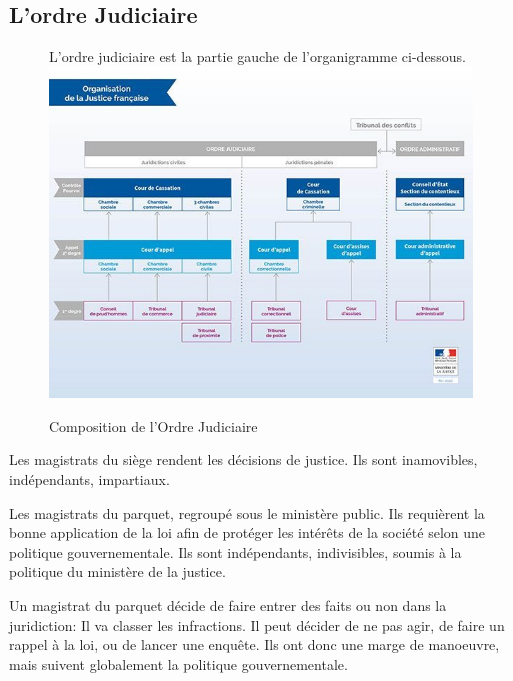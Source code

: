 \documentclass[math]{cours}
\begin{document}
\subsection{L'ordre Judiciaire}

\begin{figure}[h]
	\centering
	L'ordre judiciaire est la partie gauche de l'organigramme ci-dessous.
	\includegraphics{orga_juridictionnelle}
	\caption{Composition de l'Ordre Judiciaire}
	\label{fig:ordre_judiciaire}
\end{figure}
\begin{definition}
	Les magistrats du siège rendent les décisions de justice.
	Ils sont inamovibles, indépendants, impartiaux.
	\label{def:siege}
\end{definition}
\begin{definition}
	Les magistrats du parquet, regroupé sous le ministère public.
	Ils requièrent la bonne application de la loi afin de protéger les intérêts de la société selon une politique gouvernementale.
	Ils sont indépendants, indivisibles, soumis à la politique du ministère de la justice.
	\label{def:parquet}
\end{definition}

\begin{remarque}
	Un magistrat du parquet décide de faire entrer des faits ou non dans la juridiction:
	Il va classer les infractions.
	Il peut décider de ne pas agir, de faire un rappel à la loi, ou de lancer une enquête.
	Ils ont donc une marge de manoeuvre, mais suivent globalement la politique gouvernementale.
\end{remarque}
\end{document}
